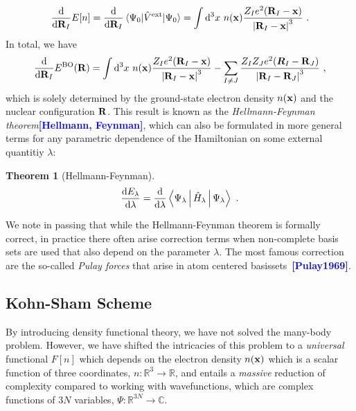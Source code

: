 \documentclass[a4paper,12pt]{book}
\renewcommand{\d}{{\rm d}}
\renewcommand{\b}[1]{\boldsymbol{#1}}
\newcommand{\CITE}[1]{\textcolor{blue}{{\bf [#1]}}}
\newtheorem*{theorem}{Theorem}
\begin{document}
\begin{align}
	\frac{\d}{\d {\bf R}_I} E[n]
		= \frac{\d}{\d {\bf R}_I} \braket{\Psi_0 | \hat V ^{\rm ext} | \Psi_0} 
		= \int \d^3 x ~ n({\bf x}) \frac{Z_I e^2 ({\bf R}_I - {\bf x})}{\left\lvert {\bf R}_I - {\bf x} \right\rvert^3}~.
\end{align}
In total, we have
\begin{align}
	\frac{\d}{\d {\bf R}_I} E^{\rm BO} ({\bf R})
	= \int \d^3 x ~ n({\bf x}) \frac{Z_I e^2 ({\bf R}_I - {\bf x})}{\left\lvert {\bf R}_I - {\bf x} \right\rvert^3}
	- \sum_{I \neq J} \frac{Z_I Z_J e^2 ({\b R}_{I}-{\bf R}_{J})}{
		\left\lvert {\bf R}_{I}-{\bf R}_{J} \right\rvert^3}~,
	\label{eq:hellmannfeynman.force}
\end{align}
which is solely determined by the ground-state electron density $n ({\bf x})$ and the nuclear configuration $\bf R$. This result is known as the \emph{Hellmann-Feynman theorem}\CITE{Hellmann, Feynman}, which can also be formulated in more general terms for any parametric dependence of the Hamiltonian on some external quantitiy $\lambda$:
\begin{theorem}[Hellmann-Feynman]
	\begin{align}
		\frac{\d E_\lambda}{\d \lambda}
			= \frac{\d}{\d \lambda}
				\Braket{\Psi_\lambda  | \hat H_\lambda | \Psi_\lambda}~.
		\label{eq:hellmannfeynman.theorem}
	\end{align}
\end{theorem}
We note in passing that while the Hellmann-Feynman theorem is formally correct, in practice there often arise correction terms when non-complete basis sets are used that also depend on the parameter $\lambda$. The most famous correction are the so-called \emph{Pulay forces} that arise in atom centered basissets~\CITE{Pulay1969}.

\subsection{Kohn-Sham Scheme}
By introducing density functional theory, we have not solved the many-body problem. However, we have shifted the intricacies of this problem to a \emph{universal} functional $F[n]$ which depends on the electron density $n({\bf x})$ which is a scalar function of three coordinates, $n: \mathds R^3 \rightarrow \mathds R$, and entails a \emph{massive} reduction of complexity compared to working with wavefunctions, which are complex functions of $3N$ variables, $\Psi: \mathds R^{3N} \rightarrow \mathds C$.
\end{document}
